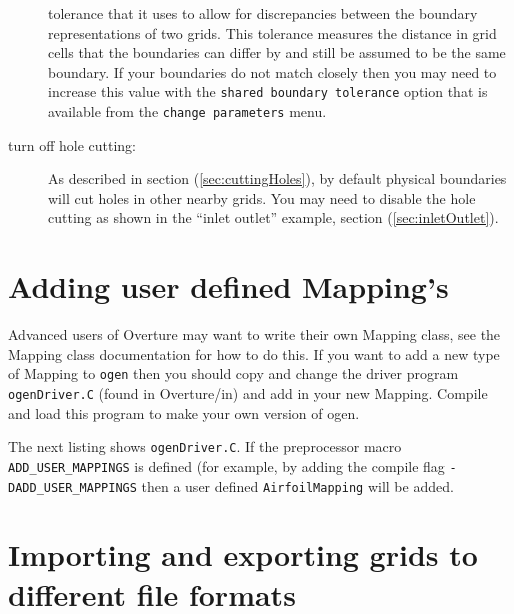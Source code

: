 \documentclass[xcolor=rgb,svgnames,dvipsnames]{article}
\newcommand{\ogen}{\homeHenshaw/Overture/ogen}
\begin{document}
\begin{description}
     tolerance that it uses to allow for discrepancies between the boundary representations of two grids.
     This tolerance measures the distance in grid cells that the boundaries can differ by and
     still be assumed to be the same boundary. If your boundaries do not match closely then you 
     may need to increase this value with the {\tt shared boundary tolerance} option
     that is available from the {\tt change parameters} menu.
  \item[turn off hole cutting:] As described in section (\ref{sec:cuttingHoles}), by default
    physical boundaries will cut holes in other nearby grids. You may need to disable the hole
    cutting as shown in the ``inlet outlet'' example, section (\ref{sec:inletOutlet}).
\end{description}


\clearpage
\section{Adding user defined Mapping's}


Advanced users of Overture may want to write their own Mapping class, see the Mapping class
documentation for how to do this. 
If you want to
add a new type of Mapping to {\tt ogen} then you should copy and change the  driver program
{\tt ogenDriver.C} (found in Overture/in) and add in your new Mapping. Compile and load this
program to make your own version of ogen.

The next listing shows {\tt ogenDriver.C}. If the preprocessor macro {\tt ADD\_USER\_MAPPINGS}
is defined (for example, by adding the compile flag {\tt -DADD\_USER\_MAPPINGS} 
then a user defined {\tt AirfoilMapping} will be added.

{\footnotesize
\listinginput[1]{1}{\ogen /ogenDriver.C}
}



% 


\section{Importing and exporting grids to different file formats}\label{sec:importExport}
\end{document}

